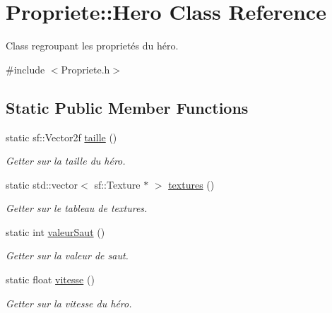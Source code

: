 \hypertarget{classPropriete_1_1Hero}{\section{Propriete\-:\-:Hero Class Reference}
\label{classPropriete_1_1Hero}
}


Class regroupant les proprietés du héro.  




{\ttfamily \#include $<$Propriete.\-h$>$}

\subsection*{Static Public Member Functions}
\begin{DoxyCompactItemize}
\item 
\hypertarget{classPropriete_1_1Hero_a6ec5cb02f35bbe219166d462c45b685d}{static sf\-::\-Vector2f \hyperlink{classPropriete_1_1Hero_a6ec5cb02f35bbe219166d462c45b685d}{taille} ()}\label{classPropriete_1_1Hero_a6ec5cb02f35bbe219166d462c45b685d}

\begin{DoxyCompactList}\small\item\em Getter sur la taille du héro. \end{DoxyCompactList}\item 
\hypertarget{classPropriete_1_1Hero_a9840588f96c8801e4bd7f4d2271d17af}{static std\-::vector$<$ sf\-::\-Texture $\ast$ $>$ \hyperlink{classPropriete_1_1Hero_a9840588f96c8801e4bd7f4d2271d17af}{textures} ()}\label{classPropriete_1_1Hero_a9840588f96c8801e4bd7f4d2271d17af}

\begin{DoxyCompactList}\small\item\em Getter sur le tableau de textures. \end{DoxyCompactList}\item 
\hypertarget{classPropriete_1_1Hero_a3d892191a1c6e48e584545bcc1cef1f2}{static int \hyperlink{classPropriete_1_1Hero_a3d892191a1c6e48e584545bcc1cef1f2}{valeur\-Saut} ()}\label{classPropriete_1_1Hero_a3d892191a1c6e48e584545bcc1cef1f2}

\begin{DoxyCompactList}\small\item\em Getter sur la valeur de saut. \end{DoxyCompactList}\item 
\hypertarget{classPropriete_1_1Hero_ab7355e0a88b69ebcd0b32d07909cd957}{static float \hyperlink{classPropriete_1_1Hero_ab7355e0a88b69ebcd0b32d07909cd957}{vitesse} ()}\label{classPropriete_1_1Hero_ab7355e0a88b69ebcd0b32d07909cd957}

\begin{DoxyCompactList}\small\item\em Getter sur la vitesse du héro. \end{DoxyCompactList}\end{DoxyCompactItemize}
